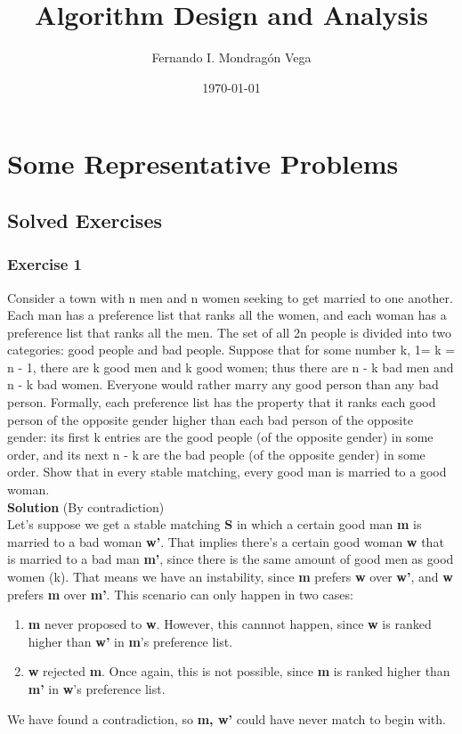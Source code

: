 \documentclass[12pt]{report}
\begin{document}
\title{Algorithm Design and Analysis}
\author{Fernando I. Mondragón Vega}
\date{\today}
\maketitle

\chapter{Some Representative Problems \cite{Kleinberg+Tardos:06a}}

\section{Solved Exercises}
\subsection*{Exercise 1}
Consider a town with n men and n women seeking to get married to one
another. Each man has a preference list that ranks all the women, and
each woman has a preference list that ranks all the men.  The set of
all 2n people is divided into two categories: good people and bad
people. Suppose that for some number k, 1= k = n - 1, there are k good
men and k good women; thus there are n - k bad men and n - k bad
women.  Everyone would rather marry any good person than any bad
person.  Formally, each preference list has the property that it ranks
each good person of the opposite gender higher than each bad person of
the opposite gender: its first k entries are the good people (of the
opposite gender) in some order, and its next n - k are the bad people
(of the opposite gender) in some order.  Show that in every stable
matching, every good man is married to a good woman.\\
\textbf{Solution} (By contradiction)\\
Let's suppose we get a stable matching \textbf{S} in which a certain
good man \textbf{m} is married to a bad woman \textbf{w'}. That
implies there's a certain good woman \textbf{w} that is married to a
bad man \textbf{m'}, since there is the same amount of good men as
good women (k). That means we have an instability, since \textbf{m}
prefers \textbf{w} over \textbf{w'}, and \textbf{w} prefers \textbf{m}
over \textbf{m'}. This scenario can only happen in two cases:
\begin{enumerate}
\item \textbf{m} never proposed to \textbf{w}. However, this cannnot happen, since \textbf{w} is ranked higher than \textbf{w'} in \textbf{m}'s preference list.
\item \textbf{w} rejected \textbf{m}. Once again, this is not possible, since \textbf{m} is ranked higher than \textbf{m'} in \textbf{w}'s preference list.
\end{enumerate}
We have found a contradiction, so \textbf{m, w'} could have never
match to begin with.
\end{document}
